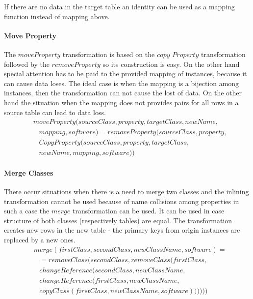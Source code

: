 \documentclass[runningheads]{comsis}
\begin{document}
If there are no data in the target table an identity can be used as a mapping function instead of mapping above. 

\paragraph{Move Property}
The $moveProperty$ transformation is based on the $copy$ $Property$ transformation followed by the $removeProperty$ so its construction is easy. On the other hand special attention has to be paid to the provided mapping of instances, because it can cause data loses. The ideal case is when the mapping is a bijection among instances, then the transformation can not cause the lost of data. On the other hand the situation when the mapping does not provides pairs for all rows in a source table can lead to data loss. 
\begin{align}
& moveProperty(sourceClass, property, targetClass, newName,\nonumber  \\
& \;\;\; mapping, software) = removeProperty(sourceClass, property, \nonumber \\
& \;\;\; CopyProperty(sourceClass, property, targetClass, \nonumber \\ 
& \;\;\;newName, mapping, software))
\end{align}

\paragraph{Merge Classes}
There occur situations when there is a need to merge two classes and the inlining transformation cannot be used because of name collisions among properties in such a case the $merge$ transformation can be used. It can be used in case structure of both classes (respectively tables) are equal. The transformation creates new rows in the new table - the primary keys from origin instances are replaced by a new ones.
\begin{align}
& merge(firstClass, secondClass, newClassName, software) = \nonumber \\
& \; \; \; = removeClass(secondClass, removeClass(firstClass,\nonumber  \\
& \; \; \; changeReference(secondClass, newClassName, \nonumber \\
& \; \; \; changeReference(firstClass, newClassName,\nonumber  \\
& \; \; \; copyClass(firstClass, newClassName, software))))))
\end{align}
\end{document}
